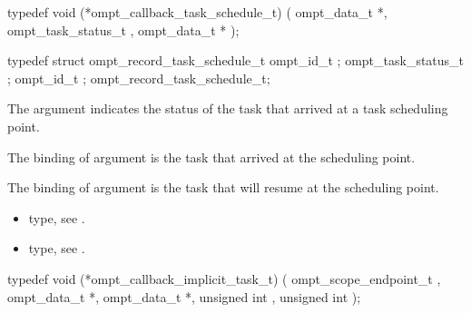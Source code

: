 \label{sec:ompt_callback_task_schedule_t}
\format

\begin{ccppspecific}
\begin{omptCallback}
typedef void (*ompt_callback_task_schedule_t) (
  ompt_data_t *,
  ompt_task_status_t ,
  ompt_data_t *
);
\end{omptCallback}
\end{ccppspecific}


\record

\begin{ccppspecific}
\begin{omptRecord}
typedef struct ompt_record_task_schedule_t {
  ompt_id_t ;
  ompt_task_status_t ;
  ompt_id_t ;
} ompt_record_task_schedule_t;
\end{omptRecord}
\end{ccppspecific}


\argdesc

The argument  indicates the status of
the task that arrived at a task scheduling point.

The binding of argument  is the task that
arrived at the scheduling point.

The binding of argument  is the task that
will resume at the scheduling point.

\crossreferences
\begin{itemize}
\item {} type, see
.

\item {} type, see
.
\end{itemize}



\label{sec:ompt_callback_implicit_task_t}
\format

\begin{ccppspecific}
\begin{omptCallback}
typedef void (*ompt_callback_implicit_task_t) (
  ompt_scope_endpoint_t ,
  ompt_data_t *,
  ompt_data_t *,
  unsigned int ,
  unsigned int 
);
\end{omptCallback}
\end{ccppspecific}


